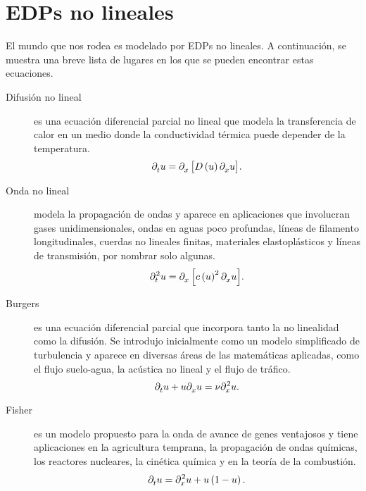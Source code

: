 \section{EDPs no lineales}

El mundo que nos rodea es modelado por EDPs no lineales.
A continuación, se muestra una breve lista de lugares en los que se
pueden encontrar estas ecuaciones.

\begin{description}
	\item[Difusión no lineal]
	      es una ecuación diferencial parcial no lineal que modela la
	      transferencia de calor en un medio donde la conductividad
	      térmica puede depender de la temperatura.
	      \begin{equation*}
		      \difcp{u}{t}=
		      \difcp{\left[D\left(u\right)\difcp{u}{x}\right]}{x}.
	      \end{equation*}

	\item[Onda no lineal]
	      modela la propagación de ondas y aparece en aplicaciones
	      que involucran gases unidimensionales, ondas en aguas poco
	      profundas, líneas de filamento longitudinales, cuerdas no
	      lineales finitas, materiales elastoplásticos y líneas de
	      transmisión, por nombrar solo algunas.
	      \begin{equation*}
		      \difcp[2]{u}{t}=
		      \difcp{\left[c\left(u\right)^{2}\difcp{u}{x}\right]}{x}.
	      \end{equation*}

	\item[Burgers]
	      es una ecuación diferencial parcial que incorpora tanto la
	      no linealidad como la difusión.
	      Se introdujo inicialmente como un modelo simplificado de
	      turbulencia y aparece en diversas áreas de las matemáticas
	      aplicadas, como el flujo suelo-agua, la acústica no lineal
	      y el flujo de tráfico.
	      \begin{equation*}
		      \difcp{u}{t}+u\difcp{u}{x}=
		      \nu\difcp[2]{u}{x}.
	      \end{equation*}

	\item[Fisher]
	      es un modelo propuesto para la onda de avance de genes
	      ventajosos y tiene aplicaciones en la agricultura temprana,
	      la propagación de ondas químicas, los reactores nucleares,
	      la cinética química y en la teoría de la combustión.
	      \begin{equation*}
		      \difcp{u}{t}=
		      \difcp[2]{u}{x}+
		      u\left(1-u\right).
	      \end{equation*}


\end{description}
